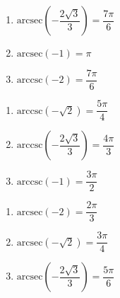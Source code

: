 \begin{multicols}{3} 

\begin{enumerate}

\setcounter{enumi}{\value{HW}}

\item $\mbox{arcsec} \left( -\dfrac{2\sqrt{3}}{3} \right) = \dfrac{7\pi}{6}$
\item $\mbox{arcsec} \left( -1 \right) = \pi$ 
\item $\mbox{arccsc} \left( -2 \right) = \dfrac{7\pi}{6}$ 

\setcounter{HW}{\value{enumi}}

\end{enumerate}

\end{multicols}

\begin{multicols}{3} 

\begin{enumerate}

\setcounter{enumi}{\value{HW}}

\item $\mbox{arccsc} \left( -\sqrt{2} \right) = \dfrac{5\pi}{4}$ 
\item $\mbox{arccsc} \left( -\dfrac{2\sqrt{3}}{3} \right) = \dfrac{4\pi}{3}$
\item $\mbox{arccsc} \left( -1 \right) = \dfrac{3\pi}{2}$ 

\setcounter{HW}{\value{enumi}}

\end{enumerate}

\end{multicols}

\begin{multicols}{3} 

\begin{enumerate}

\setcounter{enumi}{\value{HW}}

\item $\mbox{arcsec} \left( -2 \right) = \dfrac{2\pi}{3}$ 
\item $\mbox{arcsec} \left( -\sqrt{2} \right) = \dfrac{3\pi}{4}$ 
\item $\mbox{arcsec} \left( -\dfrac{2\sqrt{3}}{3} \right) = \dfrac{5\pi}{6}$

\setcounter{HW}{\value{enumi}}

\end{enumerate}

\end{multicols}

